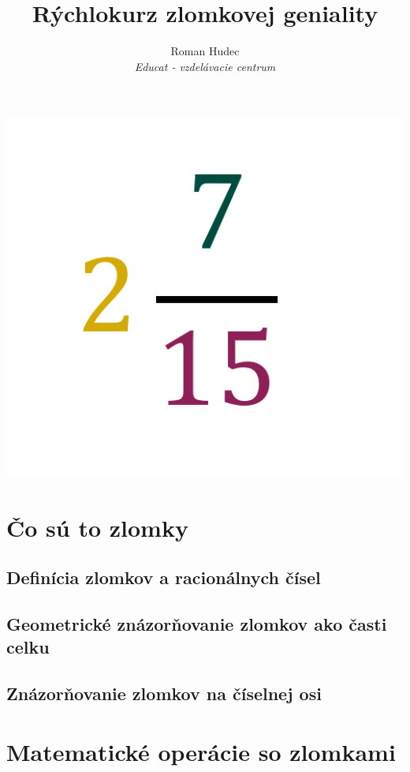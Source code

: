 \documentclass[12pt, twopage]{article}
\title{\textbf{Rýchlokurz zlomkovej geniality\\}}
\date{}
\author{Roman Hudec\\
	\textit{Educat - vzdelávacie centrum}
}
\theoremstyle{definition}
\begin{document}
	\maketitle
	
	\begin{center}
		\includegraphics{zlomok.png}
	\end{center}
	
	\newpage
	\tableofcontents
	\newpage
	
	\section{Čo sú to zlomky}
	
	\subsection{Definícia zlomkov a racionálnych čísel}
	
	\subsection{Geometrické znázorňovanie zlomkov ako časti celku}
	
	\subsection{Znázorňovanie zlomkov na číselnej osi}
	
	\newpage
	\section{Matematické operácie so zlomkami}
	
\end{document}
